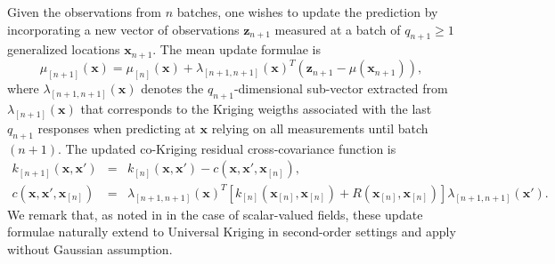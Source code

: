 \documentclass[aoas]{imsart}
\begin{document}
Given the observations from $n$ batches, one wishes to update the prediction by incorporating a new vector of observations $\mathbf{z}_{n+1}$ measured at a batch of $q_{n+1} \geq 1$ generalized locations $\bm{x}_{n+1}$. The mean update formulae is
% 
\begin{equation}\label{eq:meanCoK}
\mu_{[n+1]}(\bm{x})=\mu_{[n]}(\bm{x})+\lambda_{[n+1,n+1]}(\bm{x})^T (\mathbf{z}_{n+1}-\mu(\bm{x}_{n+1})),
\end{equation}
where $\lambda_{[n+1,n+1]}(\bm{x})$ denotes the $q_{n+1}$-dimensional sub-vector extracted from
$\lambda_{[n+1]}(\bm{x})$ that corresponds to the Kriging weigths associated with the last $q_{n+1}$ responses when 
predicting at $\bm{x}$ relying on all measurements until batch $(n+1)$.
The updated co-Kriging residual cross-covariance function is
\begin{eqnarray}\label{eq:varCoK}
k_{[n+1]}(\bm{x},\bm{x}') &=& k_{[n]}(\bm{x},\bm{x}') -c(\bm{x},\bm{x}',\bm{x}_{[n]}), \\
c(\bm{x},\bm{x}',\bm{x}_{[n]})&=&\lambda_{[n+1,n+1]}(\bm{x})^T \left[k_{[n]}(\bm{x}_{[n]}, \bm{x}_{[n]})+R(\bm{x}_{[n]}, \bm{x}_{[n]}) \right] \lambda_{{[n+1,n+1]}}(\bm{x}'). \nonumber
\end{eqnarray}
%
We remark that, as noted in \cite{Chevalier2015} in the case of scalar-valued fields, these update formulae naturally 
extend to Universal Kriging in second-order settings and apply without Gaussian assumption. 
\end{document}
